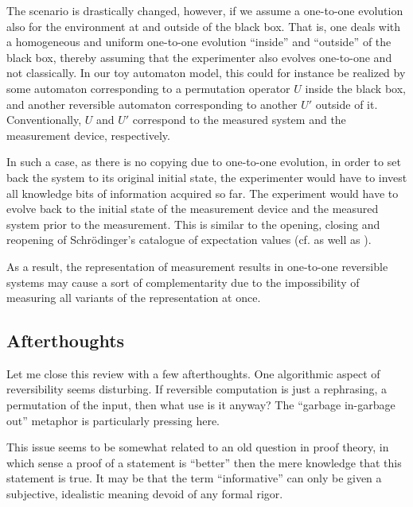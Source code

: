 The scenario is drastically changed, however, if we assume a
one-to-one evolution also for the environment at and outside
of the black box. That is, one deals with a
homogeneous
and uniform one-to-one evolution ``inside'' and ``outside'' of the black
box, thereby
assuming that the experimenter also evolves
one-to-one and not classically.
In our toy automaton model, this could for instance be realized by some
automaton corresponding to a permutation operator $U$ inside the black
box, and another reversible automaton corresponding to another $U'$
outside of it. Conventionally, $U$ and $U'$ correspond to the measured
system and the measurement device, respectively.

In such a case, as there is no copying due to one-to-one evolution,
in order to set
back the system to its original initial state, the experimenter would
have to invest all knowledge bits of information acquired so far.
The experiment would have to evolve back to the initial state of the
measurement device and the measured system prior to the measurement.
This is similar to the
opening,
closing and reopening of Schr\"odinger's catalogue of expectation values
(cf. \cite[p. 823]{schrodinger} as well as \cite{greenberger2,hkwz}).

As a result, the representation of measurement results in one-to-one
reversible systems may cause a sort of complementarity due to
the impossibility of measuring all variants of the representation
at once.


\subsection*{Afterthoughts}
Let me close this review with a few afterthoughts.
One algorithmic aspect of reversibility seems disturbing.
If reversible computation is just a
rephrasing, a permutation of the input, then what use is it anyway?
The ``garbage in-garbage out'' metaphor is particularly pressing here.

This issue seems to be
somewhat related to an old question in proof theory, in which sense a
proof of a statement is ``better'' then the mere knowledge that this
statement is true.
It may be that the term
``informative'' can only be given a subjective, idealistic meaning
devoid of any formal rigor.


%
%

